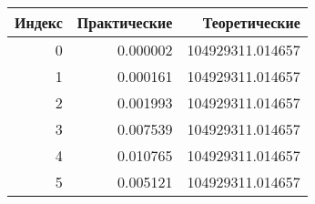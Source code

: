 \begin{tabular}{rrr}
\toprule
Индекс & Практические & Теоретические \\
\midrule
0 & 0.000002 & 104929311.014657 \\
1 & 0.000161 & 104929311.014657 \\
2 & 0.001993 & 104929311.014657 \\
3 & 0.007539 & 104929311.014657 \\
4 & 0.010765 & 104929311.014657 \\
5 & 0.005121 & 104929311.014657 \\
\bottomrule
\end{tabular}
